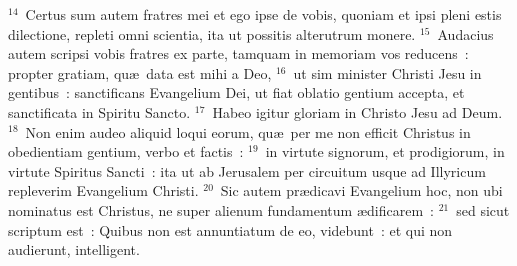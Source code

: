 ${}^{14}$~Certus sum autem fratres mei et ego ipse de vobis, quoniam et ipsi pleni estis dilectione, repleti omni scientia, ita ut possitis alterutrum monere.
${}^{15}$~Audacius autem scripsi vobis fratres ex parte, tamquam in memoriam vos reducens~: propter gratiam, qu\ae\ data est mihi a Deo,
${}^{16}$~ut sim minister Christi Jesu in gentibus~: sanctificans Evangelium Dei, ut fiat oblatio gentium accepta, et sanctificata in Spiritu Sancto.
${}^{17}$~Habeo igitur gloriam in Christo Jesu ad Deum.
${}^{18}$~Non enim audeo aliquid loqui eorum, qu\ae\ per me non efficit Christus in obedientiam gentium, verbo et factis~:
${}^{19}$~in virtute signorum, et prodigiorum, in virtute Spiritus Sancti~: ita ut ab Jerusalem per circuitum usque ad Illyricum repleverim Evangelium Christi.
${}^{20}$~Sic autem pr\ae dicavi Evangelium hoc, non ubi nominatus est Christus, ne super alienum fundamentum \ae dificarem~:
${}^{21}$~sed sicut scriptum est~: Quibus non est annuntiatum de eo, videbunt~: et qui non audierunt, intelligent.


